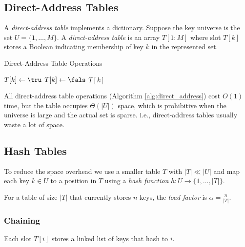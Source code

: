 \subsection{Direct-Address Tables}
\label{subsec:direct_address}
\begin{definition}
A \emph{direct-address table} implements a dictionary.
Suppose the key universe is the set \(U=\{1,\dots,M\}\).
A \emph{direct-address table} is an array \(T[1:M]\) where slot \(T[k]\) stores a Boolean indicating membership of key \(k\) in the represented set.
\end{definition}
\begin{algorithm}[htb]
  \caption{Direct-Address Table Operations}
  \label{alg:direct_address}
  \begin{algorithmic}[1]
      \State $T[k] \gets \tru$  \EndFunction
      \State $T[k] \gets \fals$ \EndFunction
      \State \Return $T[k]$     \EndFunction
  \end{algorithmic}
\end{algorithm}
All direct-address table operations (Algorithm \ref{alg:direct_address}) cost \(O(1)\) time, but the table occupies \(\Theta(|U|)\) space, which is prohibitive when the universe is large and the actual set is sparse.
i.e., direct-address tables usually waste a lot of space.


\subsection{Hash Tables}
\label{subsec:hash_tables}

To reduce the space overhead we use a smaller table \(T\) with \(|T| \ll |U|\) and map each key \(k\in U\) to a position in \(T\) using a
\emph{hash function} \(h:U\rightarrow\{1,\dots,|T|\}\).

\begin{definition}
For a table of size \(|T|\) that currently stores \(n\) keys, the
\emph{load factor} is \(\alpha = \frac{n}{|T|}\).
\end{definition}

\subsubsection{Chaining}
Each slot \(T[i]\) stores a linked list of keys that hash to \(i\).

